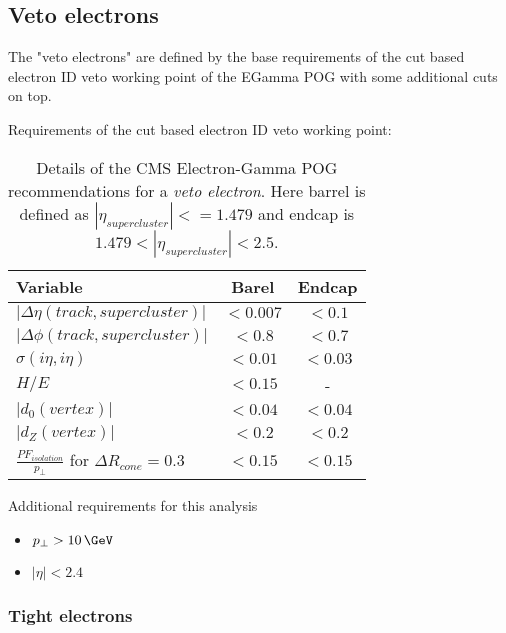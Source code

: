 \subsection{Veto electrons}

The "veto electrons" are defined by the base requirements of the cut based electron ID veto working point of the EGamma POG with some additional cuts on top. 
  
Requirements of the cut based electron ID veto working point:
 
\begin{table}[htp]
  
\begin{tabular}{|l|c|c|}
\hline
Variable & Barel & Endcap \\
\hline\hline
$| \Delta\eta(track,supercluster) |$ & $<0.007$ & $<0.1$  \\
$| \Delta\phi(track,supercluster) |$ & $<0.8  $ & $<0.7$  \\
$ \sigma(i\eta,i\eta)$               & $<0.01 $ & $<0.03$ \\
$H/E$                                & $<0.15 $ &       - \\
$|d_{0}(vertex)|$                    & $<0.04 $ & $<0.04$ \\
$|d_{Z}(vertex)|$                    & $<0.2  $ & $<0.2 $ \\
$\frac{PF_{isolation}}{p_{\perp}}$ for $ \Delta R_{cone}=0.3$  & $<0.15 $ & $<0.15$ \\
\hline
\end{tabular}
\caption{Details of the \gls{CMS} Electron-Gamma \gls{POG} recommendations for a \textit{veto electron}. Here barrel is defined as $ |\eta_{supercluster}|<=1.479 $ and endcap is $ 1.479 < |\eta_{supercluster}| < 2.5 $.} 
\end{table}

 
 
Additional requirements for this analysis
\begin{itemize}
  \item $ p_{\perp} > 10\,\GeV$
  \item $ |\eta| < 2.4 $
\end{itemize}
 
\subsubsection{Tight electrons}

